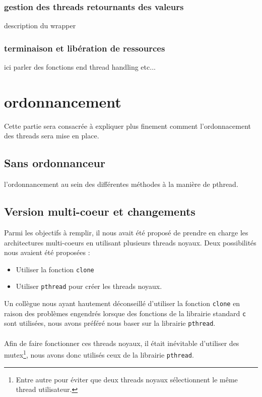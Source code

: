 \documentclass{article}
\begin{document}
			\subsubsection{gestion des threads retournants des valeurs}
			description du wrapper
			
			\subsubsection{terminaison et libération de ressources}
			ici parler des fonctions end thread handling etc...
		

	\section{ordonnancement}
	Cette partie sera consacrée à expliquer plus finement comment
    l'ordonnacement des threads sera mise en place.

		\subsection{Sans ordonnanceur}
		l'ordonnancement au sein des différentes méthodes à la manière
        de pthread.

		\subsection{Version multi-coeur et changements}
		Parmi les objectifs à remplir, il nous avait été proposé de prendre
        en charge les architectures multi-coeurs en utilisant plusieurs
        threads noyaux. Deux possibilités nous avaient été proposées :
        \begin{itemize}
          \item Utiliser la fonction \verb!clone!
          \item Utiliser \verb!pthread! pour créer les threads noyaux.
        \end{itemize}
        Un collègue nous ayant hautement déconseillé d'utiliser la fonction
        \verb!clone! en raison des problèmes engendrés lorsque des fonctions
        de la librairie standard \verb!c! sont utilisées, nous avons préféré
        nous baser sur la librairie \verb!pthread!.
        \paragraph{}
        Afin de faire fonctionner ces threads noyaux, il était inévitable
        d'utiliser des mutex\footnote{Entre autre pour éviter que deux
          threads noyaux sélectionnent le même thread utilisateur.}, nous
        avons donc utilisés ceux de la librairie \verb!pthread!. 
\end{document}

